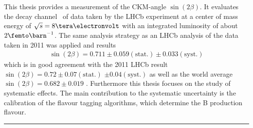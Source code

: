 \section*{\abstractname}
This thesis provides a measurement of the CKM-angle $\sin(2\beta)$. It evaluates the decay channel \Decaychannel\ of data taken by the LHCb experiment at a center of mass energy of $\sqrt{s}=8\tera\electronvolt$ with an integrated luminosity of about $2\femto\barn^{-1}$. The same analysis strategy as an LHCb analysis of the data taken in 2011 \cite{lhcb-paper} was applied and results
\begin{align*}
\sin(2\beta) = 0.711 \pm 0.059(\text{stat.}) \pm 0.033(\text{syst.})
\end{align*}
which is in good agreement with the 2011 LHCb result $\sin(2\beta) = 0.72 \pm 0.07 (\text{stat.})$ $\pm 0.04 (\text{syst.})$ \cite{lhcb-paper} as well as the world average $\sin(2\beta) = 0.682 \pm 0.019$ \cite{pdg-average}. Furthermore this thesis focuses on the study of systematic effects. The main contribution to the systematic uncertainty is the calibration of the flavour tagging algorithms, which determine the B production flavour. \\ \hrule
\ZifferPunktAn




